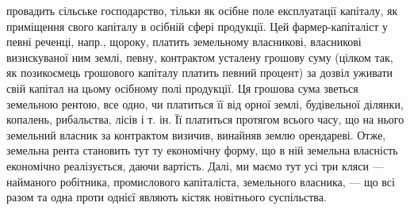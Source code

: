 \parcont{}  %
провадить сільське господарство, тільки як осібне поле експлуатації капіталу, як
приміщення свого капіталу в осібній сфері продукції. Цей фармер-капіталіст у
певні реченці, напр., щороку, платить земельному власникові, власникові визискуваної
ним землі, певну, контрактом усталену грошову суму (цілком так, як позикоємець
грошового капіталу платить певний процент) за дозвіл уживати свій капітал
на цьому осібному полі продукції. Ця грошова сума зветься земельною рентою,
все одно, чи платиться її від орної землі, будівельної ділянки, копалень, рибальства,
лісів і т. ін. Її платиться протягом всього часу, що на нього земельний
власник за контрактом визичив, винайняв землю орендареві. Отже, земельна
рента становить тут ту економічну форму, що в ній земельна власність економічно
реалізується, даючи вартість. Далі, ми маємо тут усі три кляси — найманого
робітника, промислового капіталіста, земельного власника, — що всі разом
та одна проти однієї являють кістяк новітнього суспільства.

